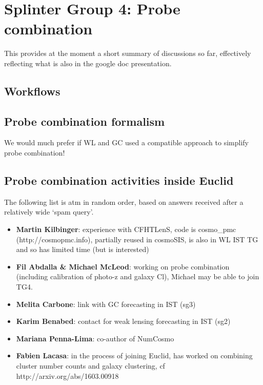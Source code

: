 
\section{Splinter Group 4: Probe combination}

This provides at the moment a short summary of discussions so far, effectively
reflecting what is also in the google doc presentation.

\subsection{Workflows}


\subsection{Probe combination formalism}


We would much prefer if WL and GC used a compatible approach to simplify probe combination!

\subsection{Probe combination activities inside Euclid}

The following list is atm in random order, based on answers received after
a relatively wide `spam query'.

\begin{itemize}
\item {\bf Martin Kilbinger}: experience with CFHTLenS, code is cosmo\_pmc (http://cosmopmc.info), partially reused in cosmoSIS, is also in WL IST TG and so has limited time (but is interested)
\item {\bf Fil Abdalla \& Michael McLeod}: working on probe combination (including calibration of photo-z and galaxy Cl), Michael may be able to join TG4.
\item {\bf Melita Carbone}: link with GC forecasting in IST (sg3)
\item {\bf Karim Benabed}: contact for weak lensing forecasting in IST (sg2)
\item {\bf Mariana Penna-Lima}: co-author of NumCosmo
\item {\bf Fabien Lacasa}: in the process of joining Euclid, has worked on combining cluster number counts and galaxy clustering, cf http://arxiv.org/abs/1603.00918
\end{itemize}

